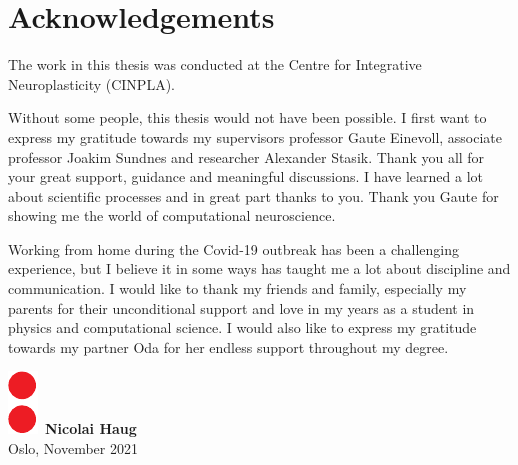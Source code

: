 \chapter*{Acknowledgements}
\thispagestyle{plain}

The work in this thesis was conducted at the Centre for Integrative Neuroplasticity (CINPLA).

Without some people, this thesis would not have been possible. I first want to express my gratitude towards my supervisors professor Gaute Einevoll, associate professor Joakim Sundnes and researcher Alexander Stasik. Thank you all for your great support, guidance and meaningful discussions. I have learned a lot about scientific processes and in great part thanks to you. Thank you Gaute for showing me the world of computational neuroscience.

Working from home during the Covid-19 outbreak has been a challenging experience, but I believe it in some ways has taught me a lot about discipline and communication. I would like to thank my friends and family, especially my parents for their unconditional support and love in my years as a student in physics and computational science. I would also like to express my gratitude towards my partner Oda for her endless support throughout my degree. 
\\ [8 pt]

\begin{flushright}
\includegraphics[height = 1.5ex]{latex/latex-report/3_Images/Logo/UiO/uio-colon.pdf}\, \textbf{Nicolai Haug}
\\
Oslo, November 2021
\end{flushright}
